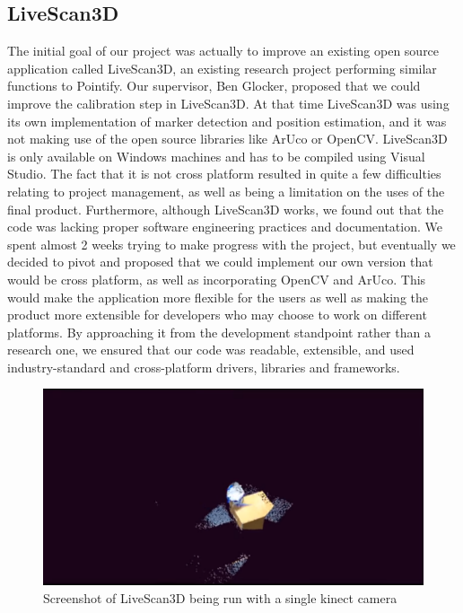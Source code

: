 \documentclass{article}
\begin{document}
\subsection{LiveScan3D}
The initial goal of our project was actually to improve an existing open source application called LiveScan3D, an existing research project performing similar functions to Pointify. Our supervisor, Ben Glocker, proposed that we could improve the calibration step in LiveScan3D. At that time LiveScan3D was using its own implementation of marker detection and position estimation, and it was not making use of the open source libraries like ArUco or OpenCV. LiveScan3D is only available on Windows machines and has to be compiled using Visual Studio. The fact that it is not cross platform resulted in quite a few difficulties relating to project management, as well as being a limitation on the uses of the final product. Furthermore, although LiveScan3D works, we found out that the code was lacking proper software engineering practices and documentation. We spent almost 2 weeks trying to make progress with the project, but eventually we decided to pivot and proposed that we could implement our own version that would be cross platform, as well as incorporating OpenCV and ArUco. This would make the application more flexible for the users as well as making the product more extensible for developers who may choose to work on different platforms. By approaching it from the development standpoint rather than a research one, we ensured that our code was readable, extensible, and used industry-standard and cross-platform drivers, libraries and frameworks.
\begin{figure}[h]
  \centering
  \includegraphics[scale=0.3]{livescan}
  \caption{Screenshot of LiveScan3D being run with a single kinect camera}
  \label{fig:livescan}
\end{figure}
\end{document}
